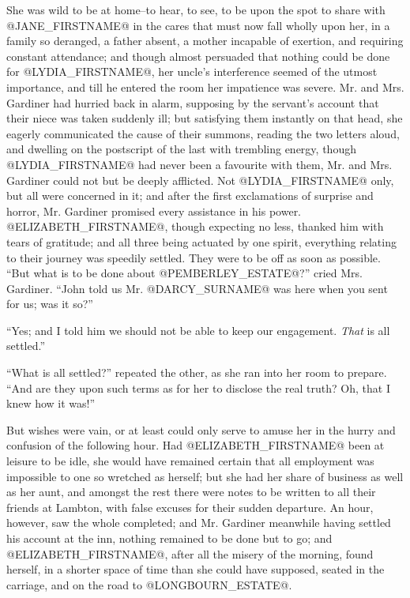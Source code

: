 She was wild to be at home--to hear, to see, to be upon the spot to
share with @JANE_FIRSTNAME@ in the cares that must now fall wholly upon her, in a
family so deranged, a father absent, a mother incapable of exertion, and
requiring constant attendance; and though almost persuaded that nothing
could be done for @LYDIA_FIRSTNAME@, her uncle's interference seemed of the utmost
importance, and till he entered the room her impatience was severe. Mr.
and Mrs. Gardiner had hurried back in alarm, supposing by the servant's
account that their niece was taken suddenly ill; but satisfying them
instantly on that head, she eagerly communicated the cause of their
summons, reading the two letters aloud, and dwelling on the postscript
of the last with trembling energy, though @LYDIA_FIRSTNAME@ had never been a
favourite with them, Mr. and Mrs. Gardiner could not but be deeply
afflicted. Not @LYDIA_FIRSTNAME@ only, but all were concerned in it; and after the
first exclamations of surprise and horror, Mr. Gardiner promised every
assistance in his power. @ELIZABETH_FIRSTNAME@, though expecting no less, thanked
him with tears of gratitude; and all three being actuated by one spirit,
everything relating to their journey was speedily settled. They were to
be off as soon as possible. ``But what is to be done about @PEMBERLEY_ESTATE@?''
cried Mrs. Gardiner. ``John told us Mr. @DARCY_SURNAME@ was here when you sent for
us; was it so?''

``Yes; and I told him we should not be able to keep our engagement.
\textit{That} is all settled.''

``What is all settled?'' repeated the other, as she ran into her room to
prepare. ``And are they upon such terms as for her to disclose the real
truth? Oh, that I knew how it was!''

But wishes were vain, or at least could only serve to amuse her in the
hurry and confusion of the following hour. Had @ELIZABETH_FIRSTNAME@ been at leisure
to be idle, she would have remained certain that all employment was
impossible to one so wretched as herself; but she had her share of
business as well as her aunt, and amongst the rest there were notes to
be written to all their friends at Lambton, with false excuses for their
sudden departure. An hour, however, saw the whole completed; and Mr.
Gardiner meanwhile having settled his account at the inn, nothing
remained to be done but to go; and @ELIZABETH_FIRSTNAME@, after all the misery of
the morning, found herself, in a shorter space of time than she could
have supposed, seated in the carriage, and on the road to @LONGBOURN_ESTATE@.



